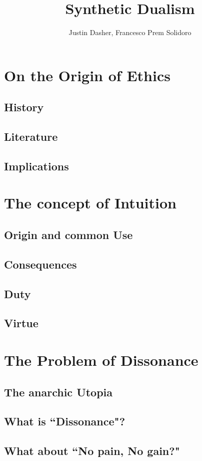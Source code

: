 \documentclass[12pt]{article}
\title{Synthetic Dualism}
\author{Justin Dasher, Francesco Prem Solidoro}
\begin{document}
\maketitle
\tableofcontents
\section{On the Origin of Ethics}
\subsection{History}
\subsection{Literature}
\subsection{Implications}
\section{The concept of Intuition}
\subsection{Origin and common Use}
\subsection{Consequences}
\subsection{Duty}
\subsection{Virtue}
\section{The Problem of Dissonance}
\subsection{The anarchic Utopia}
\subsection{What is ``Dissonance"?}
\subsection{What about ``No pain, No gain?"}
\end{document}
